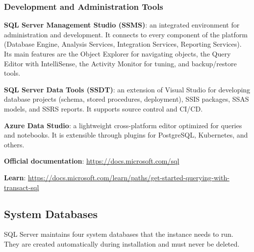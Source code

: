 \subsubsection{Development and Administration Tools}
\label{subsec:sql-server-tools}

\textbf{SQL Server Management Studio (SSMS)}: an integrated environment for administration and development. It connects to every component of the platform (Database Engine, Analysis Services, Integration Services, Reporting Services). Its main features are the Object Explorer for navigating objects, the Query Editor with IntelliSense, the Activity Monitor for tuning, and backup/restore tools.

\textbf{SQL Server Data Tools (SSDT)}: an extension of Visual Studio for developing database projects (schema, stored procedures, deployment), SSIS packages, SSAS models, and SSRS reports. It supports source control and CI/CD.

\textbf{Azure Data Studio}: a lightweight cross-platform editor optimized for queries and notebooks. It is extensible through plugins for PostgreSQL, Kubernetes, and others.

\begin{theorybox}[frametitle={Resources}]
\textbf{Official documentation}: \url{https://docs.microsoft.com/sql}

\textbf{Learn}: \url{https://docs.microsoft.com/learn/paths/get-started-querying-with-transact-sql}
\end{theorybox}

\subsection{System Databases}
\label{sec:system-databases}

SQL Server maintains four system databases that the instance needs to run. They are created automatically during installation and must never be deleted.

